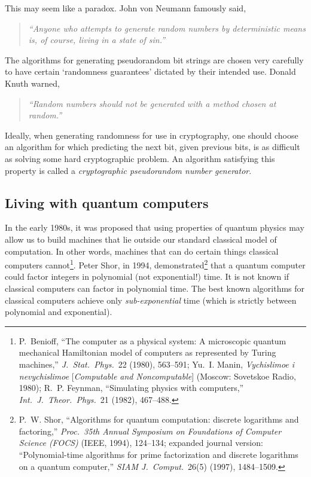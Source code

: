 \documentclass{article}
\theoremstyle{plain}
\theoremstyle{definition}
\theoremstyle{remark}
\numberwithin{theorem}{section}
\begin{document}
This may seem like a paradox.  John von Neumann famously said,

\begin{quote}
    \emph{“Anyone who attempts to generate random numbers by deterministic means is, of course, living in a state of sin.”}
\end{quote}

The algorithms for generating pseudorandom bit strings are chosen very carefully to have certain `randomness guarantees' dictated by their intended use.  Donald Knuth warned,

\begin{quote}
  \emph{“Random numbers should not be generated with a method chosen at random.”}
\end{quote}

Ideally, when generating randomness for use in cryptography, one should choose an algorithm for which predicting the next bit, given previous bits, is as difficult as solving some hard cryptographic problem.  An algorithm satisfying this property is called a \emph{cryptographic pseudorandom number generator}.


\subsection{Living with quantum computers}

In the early 1980s, it was proposed that using properties of quantum physics may allow us to build machines that lie outside our standard classical model of computation.  In other words, machines that can do certain things classical computers cannot\footnote{P.~Benioff, ``The computer as a physical system: A microscopic quantum mechanical Hamiltonian model of computers as represented by Turing machines,'' \emph{J.~Stat.~Phys.}~22 (1980), 563--591; Yu.~I. Manin, \emph{Vychislimoe i nevychislimoe} [\emph{Computable and Noncomputable}] (Moscow: Sovetskoe Radio, 1980); R.~P. Feynman, ``Simulating physics with computers,'' \emph{Int.~J.~Theor.~Phys.}~21 (1982), 467--488.}.  Peter Shor, in 1994, demonstrated\footnote{P.~W. Shor, ``Algorithms for quantum computation: discrete logarithms and factoring,'' \emph{Proc.~35th Annual Symposium on Foundations of Computer Science (FOCS)} (IEEE, 1994), 124--134; expanded journal version: ``Polynomial-time algorithms for prime factorization and discrete logarithms on a quantum computer,'' \emph{SIAM J.~Comput.}~26(5) (1997), 1484--1509.} that a quantum computer could factor integers in polynomial (not exponential!) time.  It is not known if classical computers can factor in polynomial time.  The best known algorithms for classical computers achieve only \emph{sub-exponential} time (which is strictly between polynomial and exponential).
\end{document}
